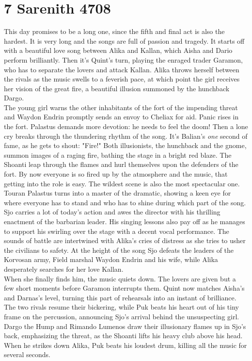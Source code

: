 \section{7 Sarenith 4708}

This day promises to be a long one, since the fifth and final act is also the hardest. It is very long and the songs are full of passion and tragedy. It starts off with a beautiful love song between Alika and Kallan, which Aisha and Dario perform brilliantly. Then it's Quint's turn, playing the enraged trader Garamon, who has to separate the lovers and attack Kallan. Alika throws herself between the rivals as the music swells to a feverish pace, at which point the girl receives her vision of the great fire, a beautiful illusion summoned by the hunchback Dargo.\\

The young girl warns the other inhabitants of the fort of the impending threat and Waydon Endrin promptly sends an envoy to Cheliax for aid. Panic rises in the fort. Palastus demands more devotion: he needs to feel the doom! Then a lone cry breaks through the thundering rhythm of the song. It's Balian's {\itshape one} second of fame, as he gets to shout: "Fire!" Both illusionists, the hunchback and the gnome, summon images of a raging fire, bathing the stage in a bright red blaze. The Shoanti leap through the flames and hurl themselves upon the defenders of the fort. By now everyone is so fired up by the atmosphere and the music, that getting into the role is easy. The wildest scene is also the most spectacular one. Touran Palastus turns into a master of the dramatic, showing a keen eye for where everyone has to stand and who has to shine during which part of the song. Sjo carries a lot of today's action and awes the director with his thrilling enactment of the barbarian leader. His singing lessons also pay off as he manages to support his swirling over the stage with a decent vocal performance. The sounds of battle are intertwined with Alika's cries of distress as she tries to usher the civilians to safety. At the height of the song Sjo defeats the leaders of the Korvosan army, Field marshal Waydon Endrin and his wife, while Alika desperately searches for her love Kallan.\\

When she finally finds him, the music quiets down. The lovers are given but a few short moments before Garamon interrupts them. Quint now matches Aisha's and Darnas's level, turning this part of rehearsals into an instant of brilliance. The two rivals resume their bickering, while Puk beats his heart out of his tiny frame on the percussion, announcing Sjo's arrival behind the unsuspecting girl. Dargo the Hump and Rimando Lumenos draw their illusionary flames up in Sjo's back, emphasizing the threat, as the Shoanti lifts his heavy club above his head. When he strikes down Alika, Puk beats his loudest drum, killing all the music for several seconds.\\

